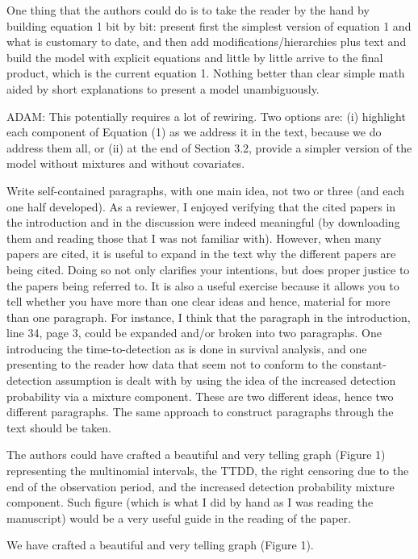 \documentclass[12pt]{article}
\renewenvironment{quote}  %
              {\list{}{\rightmargin\leftmargin}\normalfont%
               \item\relax}
              {\endlist}
\newcommand{\adam}[1]{{\color{blue} ADAM: #1}}
\begin{document}
One thing that the authors could do is to take the reader by the hand by building equation 1 bit by bit: present first the simplest version of equation 1 and what is customary to date, and then add modifications/hierarchies plus text and build the model with explicit equations and little by little arrive to the final product, which is the current equation 1. Nothing better than clear simple math aided by short explanations to present a model unambiguously.
\begin{quote}
\adam{
This potentially requires a lot of rewiring.  Two options are: (i) highlight each component of Equation (1) as we address it in the text, because we do address them all, or (ii) at the end of Section 3.2, provide a simpler version of the model without mixtures and without covariates.
}
\end{quote}

Write self-contained paragraphs, with one main idea, not two or three (and each one half developed). As a reviewer, I enjoyed verifying that the cited papers in the introduction and in the discussion were indeed meaningful (by downloading them and reading those that I was not familiar with). However, when many papers are cited, it is useful to expand in the text why the different papers are being cited.  Doing so not only clarifies your intentions, but does proper justice to the papers being referred to. It is also a useful exercise because it allows you to tell whether you have more than one clear ideas and hence, material for more than one paragraph.  For instance, I think that the paragraph in the introduction, line 34, page 3, could be expanded and/or broken into two paragraphs.  One introducing the time-to-detection as is done in survival analysis, and one presenting to the reader how data that seem not to conform to the constant-detection assumption is dealt with by
using the idea of the increased detection probability via a mixture component. These are two different ideas, hence two different paragraphs. The same approach to construct paragraphs through the text should be taken.

The authors could have crafted a beautiful and very telling graph (Figure 1) representing the multinomial intervals, the TTDD, the right censoring due to the end of the observation period, and the increased detection probability mixture component. Such figure (which is what I did by hand as I was reading the manuscript) would be a very useful guide in the reading of the paper.
\begin{quote}
We have crafted a beautiful and very telling graph (Figure 1).
\end{quote}
\end{document}
